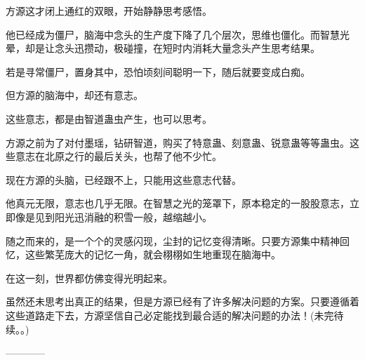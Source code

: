 \begin{this_body}
方源这才闭上通红的双眼，开始静静思考感悟。

他已经成为僵尸，脑海中念头的生产度下降了几个层次，思维也僵化。而智慧光晕，却是让念头迅攒动，极碰撞，在短时内消耗大量念头产生思考结果。

若是寻常僵尸，置身其中，恐怕顷刻间聪明一下，随后就要变成白痴。

但方源的脑海中，却还有意志。

这些意志，都是由智道蛊虫产生，也可以思考。

方源之前为了对付墨瑶，钻研智道，购买了特意蛊、刻意蛊、锐意蛊等等蛊虫。这些意志在北原之行的最后关头，也帮了他不少忙。

现在方源的头脑，已经跟不上，只能用这些意志代替。

他真元无限，意志也几乎无限。在智慧之光的笼罩下，原本稳定的一股股意志，立即像是见到阳光迅消融的积雪一般，越缩越小。

随之而来的，是一个个的灵感闪现，尘封的记忆变得清晰。只要方源集中精神回忆，这些繁芜庞大的记忆一角，就会栩栩如生地重现在脑海中。

在这一刻，世界都仿佛变得光明起来。

虽然还未思考出真正的结果，但是方源已经有了许多解决问题的方案。只要遵循着这些道路走下去，方源坚信自己必定能找到最合适的解决问题的办法！(未完待续。。)

------------

\end{this_body}

